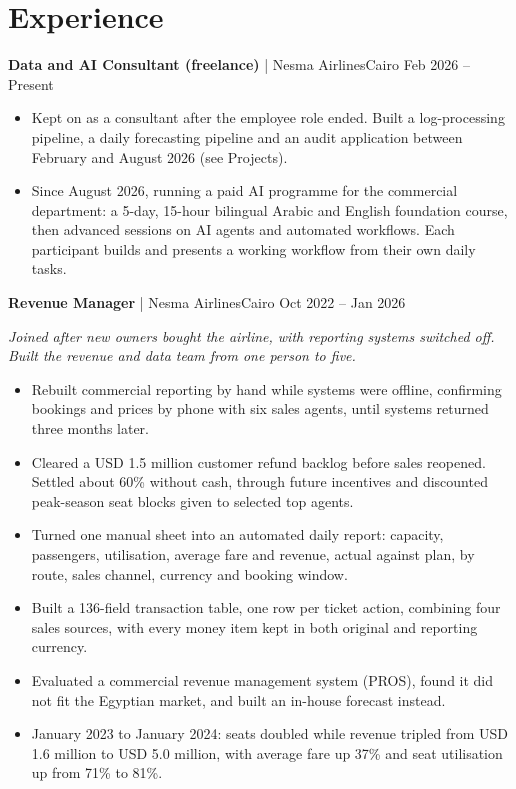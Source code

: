 \documentclass[10pt,a4paper]{article}
\newcommand{\role}[3]{\vspace{5pt}\needspace{3\baselineskip}\textbf{#1}\,\,|\,\,#2\hfill{\small\color{muted}#3}\par}
\newcommand{\rolenote}[1]{{\small\itshape\color{muted}#1}\par}
\begin{document}
\section{Experience}
\role{Data and AI Consultant (freelance)}{Nesma Airlines}{Cairo \textperiodcentered{} Feb 2026 -- Present}
\begin{itemize}
  \item Kept on as a consultant after the employee role ended. Built a log-processing pipeline, a daily forecasting pipeline and an audit application between February and August 2026 (see Projects).
  \item Since August 2026, running a paid AI programme for the commercial department: a 5-day, 15-hour bilingual Arabic and English foundation course, then advanced sessions on AI agents and automated workflows. Each participant builds and presents a working workflow from their own daily tasks.
\end{itemize}

\role{Revenue Manager}{Nesma Airlines}{Cairo \textperiodcentered{} Oct 2022 -- Jan 2026}
\rolenote{Joined after new owners bought the airline, with reporting systems switched off. Built the revenue and data team from one person to five.}
\begin{itemize}
  \item Rebuilt commercial reporting by hand while systems were offline, confirming bookings and prices by phone with six sales agents, until systems returned three months later.
  \item Cleared a USD 1.5 million customer refund backlog before sales reopened. Settled about 60\% without cash, through future incentives and discounted peak-season seat blocks given to selected top agents.
  \item Turned one manual sheet into an automated daily report: capacity, passengers, utilisation, average fare and revenue, actual against plan, by route, sales channel, currency and booking window.
  \item Built a 136-field transaction table, one row per ticket action, combining four sales sources, with every money item kept in both original and reporting currency.
  \item Evaluated a commercial revenue management system (PROS), found it did not fit the Egyptian market, and built an in-house forecast instead.
  \item January 2023 to January 2024: seats doubled while revenue tripled from USD 1.6 million to USD 5.0 million, with average fare up 37\% and seat utilisation up from 71\% to 81\%.
\end{itemize}
\end{document}
